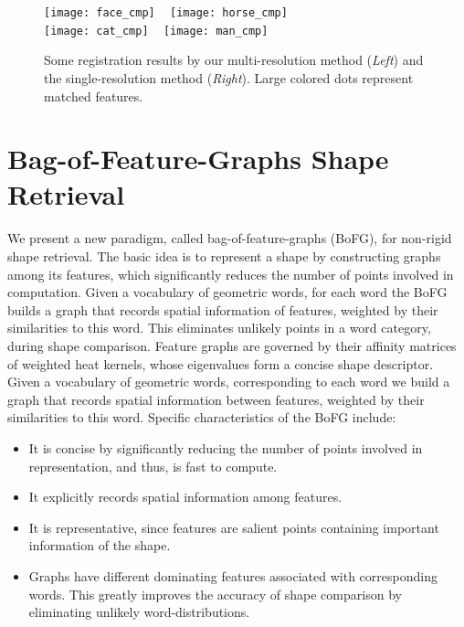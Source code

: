 \begin{figure}\centering
  \texttt{[image: face\_cmp]}
  ~
  \texttt{[image: horse\_cmp]}
  \\
  \texttt{[image: cat\_cmp]}
  ~
  \texttt{[image: man\_cmp]}
\caption{Some registration results by our multi-resolution method (\emph{Left}) and the single-resolution method \cite{Hou:2011:TVCG} (\emph{Right}). Large colored dots represent matched features.}
\label{fig:results}
\end{figure}

\section{Bag-of-Feature-Graphs Shape Retrieval}

We present a new paradigm, called bag-of-feature-graphs (BoFG), for non-rigid shape retrieval. The basic idea is to represent a shape by constructing graphs among its features, which significantly reduces the number of points involved in computation. Given a vocabulary of geometric words, for each word the BoFG builds a graph that records spatial information of features, weighted by their similarities to this word. This eliminates unlikely points in a word category, during shape comparison. Feature graphs are governed by their affinity matrices of weighted heat kernels, whose eigenvalues form a concise shape descriptor. Given a vocabulary of geometric words, corresponding to each word we build a graph that records spatial information between features, weighted by their similarities to this word. Specific characteristics of the BoFG include:
\begin{itemize}
\item It is concise by significantly reducing the number of points involved in representation, and thus, is fast to compute.
\item It explicitly records spatial information among features.
\item It is representative, since features are salient points
containing important information of the shape.
\item Graphs have different dominating features associated with corresponding words. This greatly improves the accuracy of shape comparison by eliminating unlikely word-distributions.
\end{itemize}

